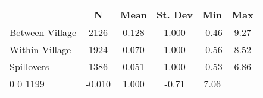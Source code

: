 \begin{tabular}{l*{5}{c}}\hline&\multicolumn{1}{c}{N}&\multicolumn{1}{c}{Mean}&\multicolumn{1}{c}{St. Dev}&\multicolumn{1}{c}{Min}&\multicolumn{1}{c}{Max}\\ \hline 
Between Village & 2126 & 0.128 & 1.000 & -0.46 & 9.27 \\
Within Village & 1924 & 0.070 & 1.000 & -0.56 & 8.52 \\
Spillovers & 1386 & 0.051 & 1.000 & -0.53 & 6.86 \\
0 0 1199 & -0.010 & 1.000 & -0.71 & 7.06 \\
\hline \end{tabular}
